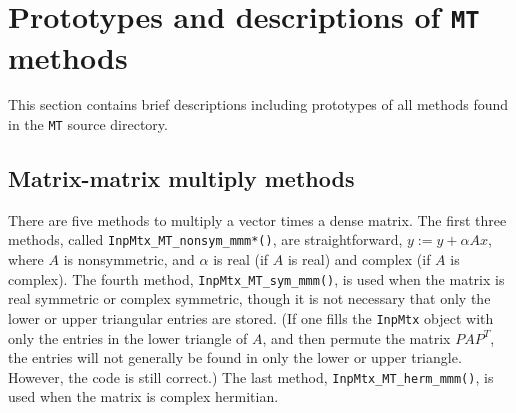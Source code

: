\par
\section{Prototypes and descriptions of {\tt MT} methods}
\label{section:MT:proto}
\par
This section contains brief descriptions including prototypes
of all methods found in the {\tt MT} source directory.
\par
\subsection{Matrix-matrix multiply methods}
\label{subsection:MT:proto:mvm}
\par
There are five methods to multiply a vector times a dense matrix.
The first three methods, called {\tt InpMtx\_MT\_nonsym\_mmm*()}, 
are straightforward,
$y := y + \alpha A x$, where $A$ is nonsymmetric, and $\alpha$ is
real (if $A$ is real) and complex (if $A$ is complex).
The fourth method, {\tt InpMtx\_MT\_sym\_mmm()}, 
is used when the matrix is real symmetric or complex symmetric, 
though it is not necessary that only the lower or upper
triangular entries are stored.
(If one fills the {\tt InpMtx} object with only the entries in
the lower triangle of $A$, and then permute the matrix $PAP^T$,
the entries will not generally be found in only the lower or upper
triangle. However, the code is still correct.)
The last method, 
{\tt InpMtx\_MT\_herm\_mmm()}, is used when the matrix is
complex hermitian.
\par
